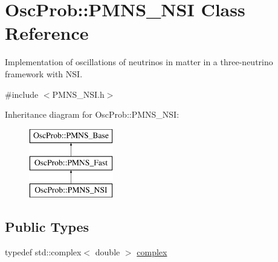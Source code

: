 \hypertarget{classOscProb_1_1PMNS__NSI}{}\section{Osc\+Prob\+:\+:P\+M\+N\+S\+\_\+\+N\+SI Class Reference}
\label{classOscProb_1_1PMNS__NSI}


Implementation of oscillations of neutrinos in matter in a three-\/neutrino framework with N\+SI.  




{\ttfamily \#include $<$P\+M\+N\+S\+\_\+\+N\+S\+I.\+h$>$}

Inheritance diagram for Osc\+Prob\+:\+:P\+M\+N\+S\+\_\+\+N\+SI\+:\begin{figure}[H]
\begin{center}
\leavevmode
\includegraphics[height=3.000000cm]{classOscProb_1_1PMNS__NSI}
\end{center}
\end{figure}
\subsection*{Public Types}
\begin{DoxyCompactItemize}
\item 
typedef std\+::complex$<$ double $>$ \hyperlink{classOscProb_1_1PMNS__Base_ae86ec4718808ce9d02e5f5b4226714ab}{complex}
\end{DoxyCompactItemize}

